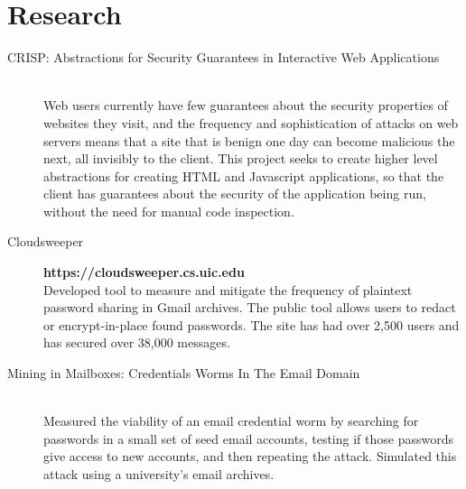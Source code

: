 \documentclass{vitae}
\begin{document}
  \section{Research}
  \begin{description}
    \item[CRISP: Abstractions for Security Guarantees in Interactive Web Applications] ~\\
    Web users currently have few guarantees about the security properties of websites they visit, and the frequency and sophistication of attacks on web servers means that a site that is benign one day can become malicious the next, all invisibly to the client.  This project seeks to create higher level abstractions for creating HTML and Javascript applications, so that the client has guarantees about the security of the application being run, without the need for manual code inspection.

    \item[Cloudsweeper] \hfill \textbf{https://cloudsweeper.cs.uic.edu}\\
    Developed tool to measure and mitigate the frequency of plaintext password sharing in Gmail archives. The public tool allows users to redact or encrypt-in-place found passwords. The site has had over 2,500 users and has secured over 38,000 messages.

    \item[Mining in Mailboxes: Credentials Worms In The Email Domain] ~\\
    Measured the viability of an email credential worm by searching for passwords in a small set of seed email accounts, testing if those passwords give access to new accounts, and then repeating the attack. Simulated this attack using a university's email archives.
  \end{description}
\end{document}
